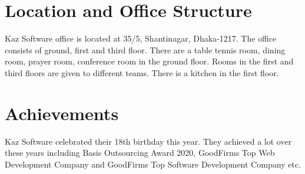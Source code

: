 \section{Location and Office Structure}

Kaz Software office is located at 35/5, Shantinagar, Dhaka-1217.
The office consists of ground, first and third floor.
There are a table tennis room, dining room, prayer room, conference room in the ground floor.
Rooms in the first and third floors are given to different teams.
There is a kitchen in the first floor.

\section{Achievements}

Kaz Software celebrated their 18th birthday this year.
They achieved a lot over these years including Basis Outsourcing Award 2020, GoodFirms Top Web Development Company and GoodFirms Top Software Development Company etc.